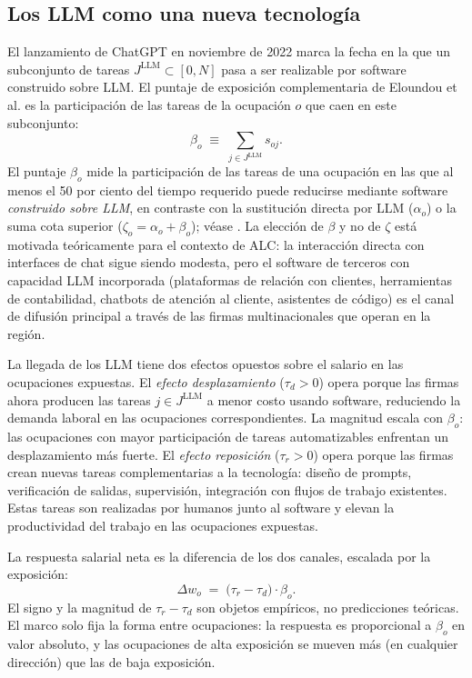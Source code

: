\subsection{Los LLM como una nueva tecnología}
\label{subsec:theory_llm}

El lanzamiento de ChatGPT en noviembre de 2022 marca la fecha en la que un subconjunto de tareas $J^{\text{LLM}} \subset [0, N]$ pasa a ser realizable por software construido sobre LLM. El puntaje de exposición complementaria de Eloundou et al. es la participación de las tareas de la ocupación $o$ que caen en este subconjunto:
\begin{equation}
\beta_o \;\equiv\; \sum_{j \in J^{\text{LLM}}} s_{oj}.
\label{eq:beta_def}
\end{equation}
El puntaje $\beta_o$ mide la participación de las tareas de una ocupación en las que al menos el 50 por ciento del tiempo requerido puede reducirse mediante software \emph{construido sobre LLM}, en contraste con la sustitución directa por LLM ($\alpha_o$) o la suma cota superior ($\zeta_o = \alpha_o + \beta_o$); véase \citet{Eloundou2023_gpt_exposure}. La elección de $\beta$ y no de $\zeta$ está motivada teóricamente para el contexto de ALC: la interacción directa con interfaces de chat sigue siendo modesta, pero el software de terceros con capacidad LLM incorporada (plataformas de relación con clientes, herramientas de contabilidad, chatbots de atención al cliente, asistentes de código) es el canal de difusión principal a través de las firmas multinacionales que operan en la región.

La llegada de los LLM tiene dos efectos opuestos sobre el salario en las ocupaciones expuestas. El \emph{efecto desplazamiento} ($\tau_d > 0$) opera porque las firmas ahora producen las tareas $j \in J^{\text{LLM}}$ a menor costo usando software, reduciendo la demanda laboral en las ocupaciones correspondientes. La magnitud escala con $\beta_o$: las ocupaciones con mayor participación de tareas automatizables enfrentan un desplazamiento más fuerte. El \emph{efecto reposición} ($\tau_r > 0$) opera porque las firmas crean nuevas tareas complementarias a la tecnología: diseño de prompts, verificación de salidas, supervisión, integración con flujos de trabajo existentes. Estas tareas son realizadas por humanos junto al software y elevan la productividad del trabajo en las ocupaciones expuestas.

La respuesta salarial neta es la diferencia de los dos canales, escalada por la exposición:
\begin{equation}
\Delta w_o \;=\; \bigl(\tau_r - \tau_d\bigr) \cdot \beta_o.
\label{eq:net_effect}
\end{equation}
El signo y la magnitud de $\tau_r - \tau_d$ son objetos empíricos, no predicciones teóricas. El marco solo fija la forma entre ocupaciones: la respuesta es proporcional a $\beta_o$ en valor absoluto, y las ocupaciones de alta exposición se mueven más (en cualquier dirección) que las de baja exposición.

